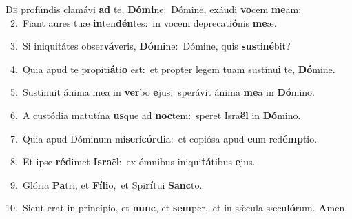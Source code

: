 \lettrine{\initial\textcolor{\initialcolor}{D}}{e} profúndis clamávi \textbf{ad} te, \textbf{Dó}\-\textbf{mi}ne:~\star Dómine, exáudi \textbf{vo}\-cem \textbf{me}\-am:\\
{\numbfont\textcolor{\numbcolor}{~2.}}~Fiant aures tuæ \textbf{in}\-ten\-\textbf{dén}\-tes:~\star in vocem deprecati\-\textbf{ó}\-nis \textbf{me}\-æ.\par
{\numbfont\textcolor{\numbcolor}{~3.}}~Si iniquitátes obser\-\textbf{vá}\-veris, \textbf{Dó}\-\textbf{mi}ne:~\star Dómine, quis \textbf{sus}\-ti\-\textbf{né}\-bit?\par
{\numbfont\textcolor{\numbcolor}{~4.}}~Quia apud te propiti\-\textbf{á}\-ti\textbf{o} est:~\star et propter legem tuam sustínu\textbf{i} te, \textbf{Dó}\-mine.\par
{\numbfont\textcolor{\numbcolor}{~5.}}~Sustínuit ánima mea in \textbf{ver}\-bo \textbf{e}\-jus:~\star sperávit ánima \textbf{me}\-a in \textbf{Dó}\-mino.\par
{\numbfont\textcolor{\numbcolor}{~6.}}~A custódia matutína \textbf{us}\-que ad \textbf{noc}\-tem:~\star speret Isra\textbf{ël} in \textbf{Dó}\-mino.\par
{\numbfont\textcolor{\numbcolor}{~7.}}~Quia apud Dóminum mi\-\textbf{se}\-ri\-\textbf{cór}\-\textbf{di}a:~\star et copiósa apud \textbf{e}\-um red\-\textbf{émp}\-tio.\par
{\numbfont\textcolor{\numbcolor}{~8.}}~Et ipse \textbf{réd}\-imet \textbf{Is}\-\textbf{ra}ël:~\star ex ómnibus iniqui\-\textbf{tá}\-tibus \textbf{e}\-jus.\par
{\numbfont\textcolor{\numbcolor}{~9.}}~Glória \textbf{Pa}\-tri, et \textbf{Fí}\-\textbf{li}o,~\star et Spi\-\textbf{rí}\-tui \textbf{Sanc}\-to.\par
{\numbfont\textcolor{\numbcolor}{10.}}~Sicut erat in princípio, et \textbf{nunc}\-, et \textbf{sem}\-per,~\star et in sǽcula sæcu\-\textbf{ló}\-rum. \textbf{A}\-men.\par
